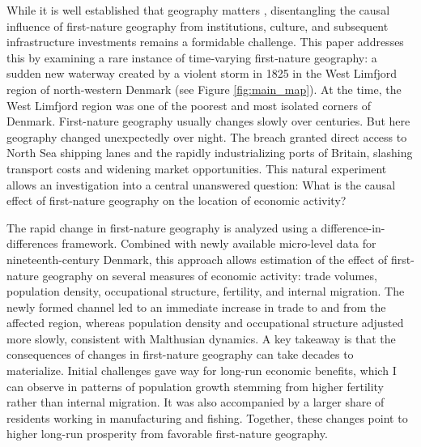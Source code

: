 \documentclass[12pt]{article}
\begin{document}
While it is well established that geography matters \citep{Henderson2018satelite, Davis2002}, disentangling the causal influence of first-nature geography from institutions, culture, and subsequent infrastructure investments remains a formidable challenge. This paper addresses this by examining a rare instance of time‑varying first‑nature geography: a sudden new waterway created by a violent storm in 1825 in the West Limfjord region of north‑western Denmark (see Figure \ref{fig:main_map}). At the time, the West Limfjord region was one of the poorest and most isolated corners of Denmark. First-nature geography usually changes slowly over centuries. But here geography changed unexpectedly over night. The breach granted direct access to North Sea shipping lanes and the rapidly industrializing ports of Britain, slashing transport costs and widening market opportunities. This natural experiment allows an investigation into a central unanswered question: What is the causal effect of first‑nature geography on the location of economic activity?

The rapid change in first-nature geography is analyzed using a difference-in-differences framework. Combined with newly available micro-level data for nineteenth-century Denmark, this approach allows estimation of the effect of first-nature geography on several measures of economic activity: trade volumes, population density, occupational structure, fertility, and internal migration. The newly formed channel led to an immediate increase in trade to and from the affected region, whereas population density and occupational structure adjusted more slowly, consistent with Malthusian dynamics. A key takeaway is that the consequences of changes in first-nature geography can take decades to materialize. Initial challenges gave way for long-run economic benefits, which I can observe in patterns of population growth stemming from higher fertility rather than internal migration. It was also accompanied by a larger share of residents working in manufacturing and fishing. Together, these changes point to higher long-run prosperity from favorable first-nature geography.
\end{document}
